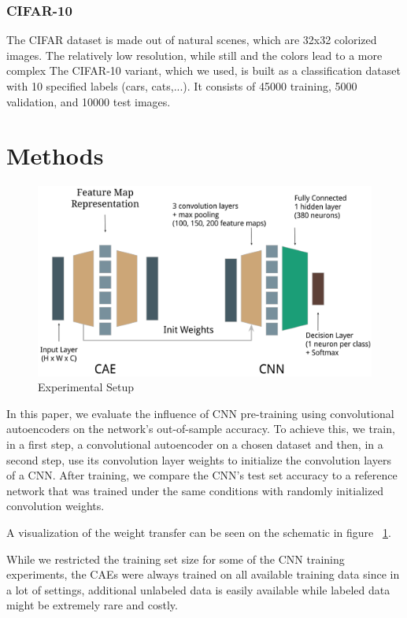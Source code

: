 \documentclass{article}
\begin{document}
  \subsubsection{CIFAR-10}
    The CIFAR dataset \citep{krizhevsky2009learning} is made out of natural scenes, which are 32x32 colorized images. The relatively low resolution, while still and the colors lead to a more complex
    The CIFAR-10 variant, which we used, is built as a classification dataset with 10 specified labels (cars, cats,...).
    It consists of 45000 training, 5000 validation, and 10000 test images.

\section{Methods}

  \begin{figure}%
    \centering
    \includegraphics[width=0.6\linewidth]{../graphics/setup.png}
    \caption{Experimental Setup}
    \label{fig:experimental_setup}
  \end{figure}

  In this paper, we evaluate the influence of CNN pre-training using convolutional autoencoders on the network's out-of-sample accuracy. To achieve this, we train, in a first step, a convolutional autoencoder on a chosen dataset and then, in a second step, use its convolution layer weights to initialize the convolution layers of a CNN. After training, we compare the CNN's test set accuracy to a reference network that was trained under the same conditions with randomly initialized convolution weights. 

  A visualization of the weight transfer can be seen on the schematic in figure ~\ref{fig:experimental_setup}. 

  While we restricted the training set size for some of the CNN training experiments, the CAEs were always trained on all available training data since in a lot of settings, additional unlabeled data is easily available while labeled data might be extremely rare and costly.  
\end{document}
